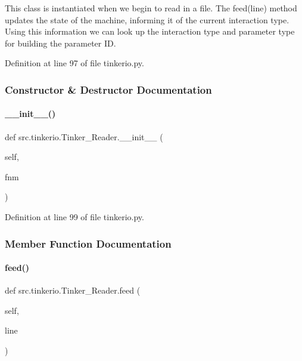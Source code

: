 This class is instantiated when we begin to read in a file. The feed(line) method updates the state of the machine, informing it of the current interaction type. Using this information we can look up the interaction type and parameter type for building the parameter ID. 

Definition at line 97 of file tinkerio.\+py.



\subsubsection{Constructor \& Destructor Documentation}
\mbox{\label{classsrc_1_1tinkerio_1_1Tinker__Reader_a0b8cd6b8396f92db9e389f61a692e984}} 
\paragraph{\texorpdfstring{\+\_\+\+\_\+init\+\_\+\+\_\+()}{\_\_init\_\_()}}
{\footnotesize\ttfamily def src.\+tinkerio.\+Tinker\+\_\+\+Reader.\+\_\+\+\_\+init\+\_\+\+\_\+ (\begin{DoxyParamCaption}\item[{}]{self,  }\item[{}]{fnm }\end{DoxyParamCaption})}



Definition at line 99 of file tinkerio.\+py.



\subsubsection{Member Function Documentation}
\mbox{\label{classsrc_1_1tinkerio_1_1Tinker__Reader_a456a3fad03449282241abbea4a866a42}} 
\paragraph{\texorpdfstring{feed()}{feed()}}
{\footnotesize\ttfamily def src.\+tinkerio.\+Tinker\+\_\+\+Reader.\+feed (\begin{DoxyParamCaption}\item[{}]{self,  }\item[{}]{line }\end{DoxyParamCaption})}



